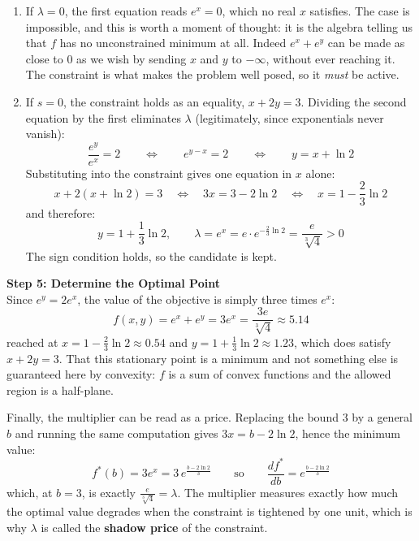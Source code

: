 \documentclass[]{article}
\begin{document}
	\begin{enumerate}
		\item If $\lambda = 0$, the first equation reads $e^{x} = 0$, which no real $x$ satisfies.
		The case is impossible, and this is worth a moment of thought: it is the algebra telling us that $f$ has no unconstrained minimum at all.
		Indeed $e^{x} + e^{y}$ can be made as close to $0$ as we wish by sending $x$ and $y$ to $-\infty$, without ever reaching it.
		The constraint is what makes the problem well posed, so it \textit{must} be active.

		\item If $s = 0$, the constraint holds as an equality, $x + 2y = 3$.
		Dividing the second equation by the first eliminates $\lambda$ (legitimately, since exponentials never vanish):
		$$
		\frac{e^{y}}{e^{x}} = 2
		\qquad \Longleftrightarrow \qquad
		e^{y-x} = 2
		\qquad \Longleftrightarrow \qquad
		y = x + \ln 2
		$$
		Substituting into the constraint gives one equation in $x$ alone:
		$$
		x + 2 \left( x + \ln 2 \right) = 3
		\quad \Longleftrightarrow \quad
		3x = 3 - 2 \ln 2
		\quad \Longleftrightarrow \quad
		x = 1 - \frac{2}{3} \ln 2
		$$
		and therefore:
		$$
		y = 1 + \frac{1}{3} \ln 2,
		\qquad
		\lambda = e^{x} = e \cdot e^{-\frac{2}{3} \ln 2} = \frac{e}{\sqrt[3]{4}} > 0
		$$
		The sign condition holds, so the candidate is kept.
	\end{enumerate}

	\textbf{Step 5: Determine the Optimal Point}\\
	Since $e^{y} = 2 e^{x}$, the value of the objective is simply three times $e^x$:
	$$
	f(x, y) = e^{x} + e^{y} = 3 e^{x} = \frac{3e}{\sqrt[3]{4}} \approx 5.14
	$$
	reached at $x = 1 - \frac{2}{3} \ln 2 \approx 0.54$ and $y = 1 + \frac{1}{3} \ln 2 \approx 1.23$, which does satisfy $x + 2y = 3$.
	That this stationary point is a minimum and not something else is guaranteed here by convexity: $f$ is a sum of convex functions and the allowed region is a half-plane.

	Finally, the multiplier can be read as a price.
	Replacing the bound $3$ by a general $b$ and running the same computation gives $3x = b - 2 \ln 2$, hence the minimum value:
	$$
	f^*(b) = 3 e^{x} = 3 \, e^{\frac{b - 2 \ln 2}{3}}
	\qquad \text{so} \qquad
	\frac{d f^*}{d b} = e^{\frac{b - 2 \ln 2}{3}}
	$$
	which, at $b = 3$, is exactly $\frac{e}{\sqrt[3]{4}} = \lambda$.
	The multiplier measures exactly how much the optimal value degrades when the constraint is tightened by one unit, which is why $\lambda$ is called the \textbf{shadow price} of the constraint.
	
\end{document}
